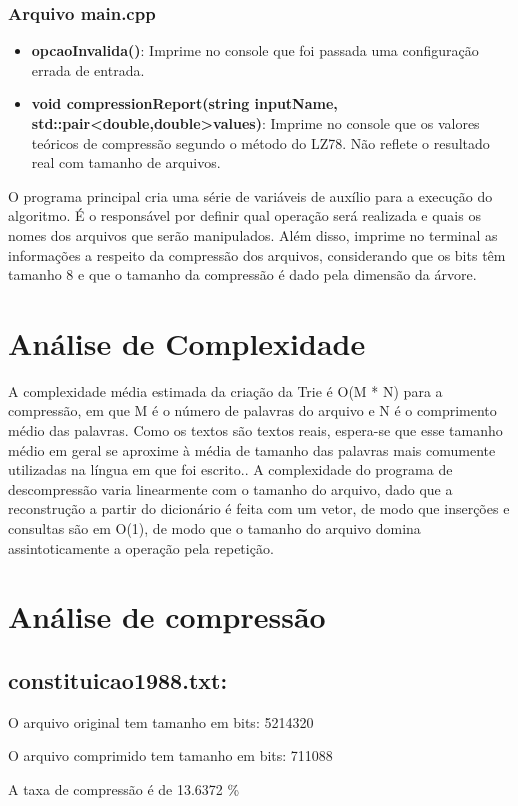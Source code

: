 \documentclass[12pt]{article}
\begin{document}
\subsubsection{Arquivo main.cpp}
\begin{itemize}
	\item \textbf{opcaoInvalida()}: Imprime no console que foi passada uma configuração errada de entrada.
	\item \textbf{void compressionReport(string inputName, std::pair<double,double>values)}: Imprime no console que
	os valores teóricos de compressão segundo o método do LZ78. Não reflete o resultado real com tamanho de arquivos.
\end{itemize}
\par O programa principal cria uma série de variáveis de auxílio para a execução do algoritmo.
É o responsável por definir qual operação será realizada e quais os nomes dos arquivos que serão manipulados.
Além disso, imprime no terminal as informações a respeito da compressão dos arquivos, considerando que os bits têm tamanho 8 e que o tamanho da compressão é dado pela dimensão da árvore.



\section{Análise de Complexidade}
\par A complexidade média estimada da criação da Trie é O(M * N) para a compressão, em que M é o número de
palavras do arquivo e N é o comprimento médio das palavras. Como os textos são textos reais, espera-se que 
esse tamanho médio em geral se aproxime à média de tamanho das palavras mais comumente utilizadas na 
língua em que foi escrito.. A complexidade do programa de descompressão varia linearmente com o
tamanho do arquivo, dado que a reconstrução a partir do dicionário é feita com um vetor, de modo que inserções e consultas
são em O(1), de modo que o tamanho do arquivo domina assintoticamente a operação pela repetição.

\section{Análise de compressão}
\subsection{constituicao1988.txt:}
\space \par O arquivo original tem tamanho em bits: 5214320
\space \par O arquivo comprimido tem tamanho em bits: 711088
\space \par A taxa de compressão é de 13.6372 \% 
\end{document}
